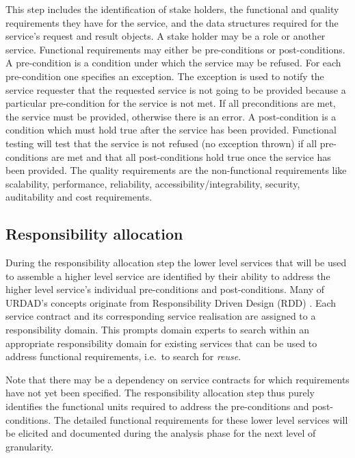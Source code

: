 This step includes the identification of stake holders, the functional and quality requirements they have for the service, and the data structures required for the service's request and result objects. A stake holder may be a role or another service. Functional requirements may either be pre-conditions or  post-conditions. A pre-condition is a condition under which the service may be refused. For each pre-condition one specifies an exception. The exception is used to notify the service requester that the requested service is not going to be provided because a particular pre-condition for the service is not met. If all preconditions are met, the service must be provided, otherwise there is an error. A post-condition is a condition which must hold true after the service has been provided. Functional testing will test that the service is not refused (no exception thrown) if all pre-conditions are met and that all post-conditions hold true once the service has been provided. The quality requirements are the non-functional requirements like scalability, performance, reliability, accessibility/integrability, security, auditability and cost requirements. 

\subsection{Responsibility allocation}

During the responsibility allocation step the lower level services that will be used to assemble a higher level service are identified by their ability to address the higher level service's individual pre-conditions and post-conditions. Many of URDAD's concepts originate from Responsibility Driven Design (RDD) \cite{wirfs-brock_object-oriented_1989,wirfs-brock_object_2002}. Each service contract and its corresponding service realisation are assigned to a responsibility domain. This prompts domain experts to search within an appropriate responsibility domain for existing services that can be used to address functional requirements, i.e.\ to search for \emph{reuse}.

Note that there may be a dependency on service contracts for which requirements have not yet been specified. The responsibility allocation step thus purely identifies the functional units required to address the pre-conditions and post-conditions. The detailed functional requirements for these lower level services will be elicited and documented during the analysis phase for the next level of granularity.  

